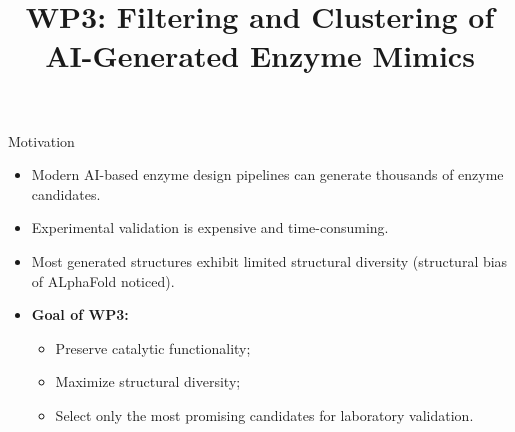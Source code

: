 \documentclass[aspectratio=169]{beamer}
\title{WP3: Filtering and Clustering of AI-Generated Enzyme Mimics}
\author{}
\date{}
\begin{document}
	
	\begin{frame}
		\titlepage
	\end{frame}
	
	\begin{frame}{Motivation}
		
		\begin{itemize}
			\item Modern AI-based enzyme design pipelines can generate thousands of enzyme candidates.
			
			\vspace{0.2cm}
			
			\item Experimental validation is expensive and time-consuming.
			
			\vspace{0.2cm}
			
			\item Most generated structures exhibit limited structural diversity (structural bias of ALphaFold noticed).
			
			\vspace{0.2cm}
			
			\item \textbf{Goal of WP3:}
			
			\begin{itemize}
				\item Preserve catalytic functionality;
				\item Maximize structural diversity;
				\item Select only the most promising candidates for laboratory validation.
			\end{itemize}
		\end{itemize}
		
	\end{frame}
	
\end{document}
